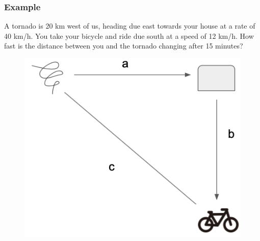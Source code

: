 \documentclass[t]{beamer}
\theoremstyle{plain}
\theoremstyle{definition}
\newcounter{heading}
\begin{document}
\begin{frame}

\footnotesize

\frametitle{Example}

A tornado is 20 km west of us, heading due east towards your house at a rate of 40 km/h.  You take your bicycle and ride due south at a speed of 12 km/h.  How fast is the distance between you and the tornado changing after 15 minutes?

\begin{figure}[t]
\begin{center}
\includegraphics[scale=0.3]{fig/tornado}
\end{center}
\end{figure}

\end{frame}
\end{document}
